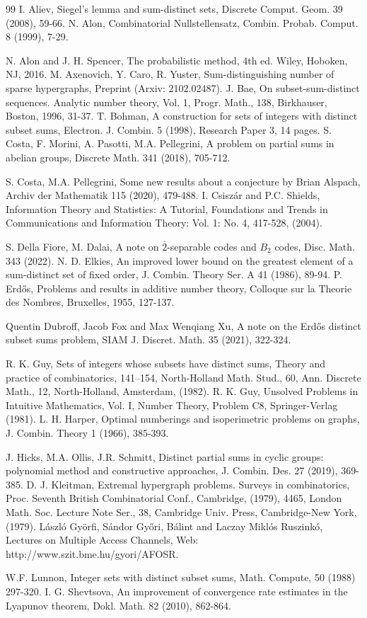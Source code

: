 \documentclass[a4paper]{amsart}
\theoremstyle{plain}
\begin{document}
\begin{thebibliography}{99}
 I. Aliev, Siegel’s lemma and sum-distinct sets, Discrete Comput. Geom. 39 (2008), 59-66.
 N. Alon,
Combinatorial Nullstellensatz,
Combin. Probab. Comput. 8 (1999), 7-29.


 N. Alon and J. H. Spencer, The probabilistic method, 4th ed. Wiley, Hoboken, NJ, 2016.
 M. Axenovich, Y. Caro, R. Yuster, Sum-distinguishing number of sparse hypergraphs, Preprint (Arxiv: 2102.02487).
 J. Bae, On subset-sum-distinct sequences. Analytic number theory, Vol. 1, Progr. Math., 138, Birkhauser, Boston,
1996, 31-37.
 T. Bohman, A construction for sets of integers with distinct subset sums, Electron. J. Combin. 5 (1998), Research
Paper 3, 14 pages.
 S. Costa, F. Morini, A. Pasotti, M.A. Pellegrini,
A problem on partial sums in abelian groups,
Discrete Math. 341 (2018), 705-712.

 S. Costa, M.A. Pellegrini,
Some new results about a conjecture by Brian Alspach,
Archiv der Mathematik 115 (2020), 479-488.
 I. Csiszár and P.C. Shields, Information Theory and Statistics: A Tutorial, Foundations and Trends in Communications and Information Theory: Vol. 1: No. 4, 417-528, (2004).

 S. Della Fiore, M. Dalai,  A note on $\overline{2}$-separable codes and $B_2$ codes,  Disc.  Math.  343 (2022).
 N. D. Elkies, An improved lower bound on the greatest element of a sum-distinct set of fixed order, J. Combin.
Theory Ser. A 41 (1986), 89-94.
 P. Erd\H{o}s, Problems and results in additive number theory, Colloque sur la Theorie des Nombres, Bruxelles, 1955, 127-137.

 Quentin Dubroff, Jacob Fox and Max Wenqiang Xu, A note on the Erd\H{o}s distinct subset sums problem, SIAM J. Discret. Math. 35 (2021), 322-324.

 R. K. Guy, Sets of integers whose subsets have distinct sums, Theory and practice of combinatorics, 141–154, North-Holland Math. Stud., 60, Ann. Discrete Math., 12, North-Holland, Amsterdam, (1982).
 R. K. Guy, Unsolved Problems in Intuitive Mathematics, Vol. I, Number Theory, Problem C8, Springer-Verlag (1981).
 L. H. Harper, Optimal numberings and isoperimetric problems on graphs, J. Combin. Theory 1 (1966), 385-393.

 J. Hicks, M.A. Ollis, J.R. Schmitt,
Distinct partial sums in cyclic groups: polynomial method and constructive approaches,
J. Combin. Des. 27 (2019), 369-385.
 D. J. Kleitman, Extremal hypergraph problems. Surveys in combinatorics, Proc. Seventh British Combinatorial
Conf., Cambridge, (1979), 4465, London Math. Soc. Lecture Note Ser., 38, Cambridge Univ. Press, Cambridge-New
York, (1979).
 L\'aszl\'o Gy\"orfi, S\'andor Gy\H{o}ri, B\'alint and Laczay Mikl\'os Ruszink\'o, Lectures on Multiple Access Channels, Web: http://www.szit.bme.hu/gyori/AFOSR.

 W.F. Lunnon, Integer sets with distinct subset sums, Math. Compute, 50 (1988)
297-320.
 I. G. Shevtsova, An improvement of convergence rate estimates in the Lyapunov theorem, Dokl. Math. 82 (2010),
862-864.
\end{thebibliography}
\end{document}
